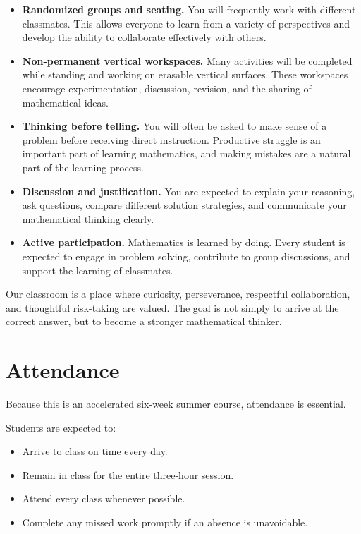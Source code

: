 \documentclass[10pt]{article}
\begin{document}
\begin{itemize}
    \item \textbf{Randomized groups and seating.} You will frequently work with different classmates. This allows everyone to learn from a variety of perspectives and develop the ability to collaborate effectively with others.

    \item \textbf{Non-permanent vertical workspaces.} Many activities will be completed while standing and working on erasable vertical surfaces. These workspaces encourage experimentation, discussion, revision, and the sharing of mathematical ideas.

    \item \textbf{Thinking before telling.} You will often be asked to make sense of a problem before receiving direct instruction. Productive struggle is an important part of learning mathematics, and making mistakes are a natural part of the learning process.

    \item \textbf{Discussion and justification.} You are expected to explain your reasoning, ask questions, compare different solution strategies, and communicate your mathematical thinking clearly.

    \item \textbf{Active participation.} Mathematics is learned by doing. Every student is expected to engage in problem solving, contribute to group discussions, and support the learning of classmates.
\end{itemize}

Our classroom is a place where curiosity, perseverance, respectful collaboration, and thoughtful risk-taking are valued. The goal is not simply to arrive at the correct answer, but to become a stronger mathematical thinker.

\section*{Attendance}

Because this is an accelerated six-week summer course, attendance is essential.

Students are expected to:

\begin{itemize}
    \item Arrive to class on time every day.
    \item Remain in class for the entire three-hour session.
    \item Attend every class whenever possible.
    \item Complete any missed work promptly if an absence is unavoidable.
\end{itemize}
\end{document}
